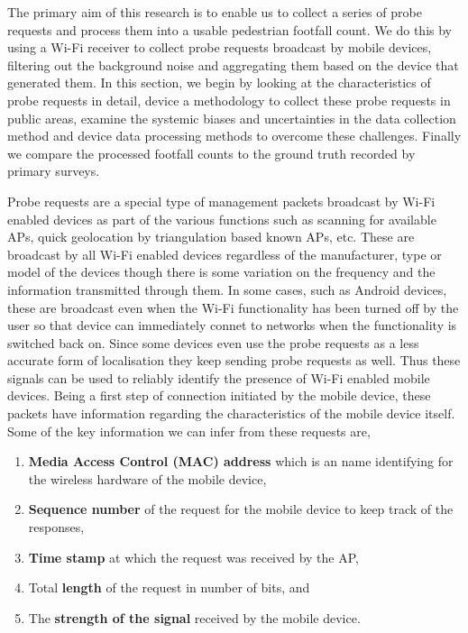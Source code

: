 The primary aim of this research is to enable us to collect a series of probe
requests and process them into a usable pedestrian footfall count. We do this by
using a Wi-Fi receiver to collect probe requests broadcast by mobile devices,
filtering out the background noise and aggregating them based on the device that
generated them. In this section, we begin by looking at the characteristics of
probe requests in detail, device a methodology to collect these probe requests
in public areas, examine the systemic biases and uncertainties in the data
collection method and device data processing methods to overcome these
challenges. Finally we compare the processed footfall counts to the ground truth
recorded by primary surveys.

Probe requests are a special type of management packets broadcast by Wi-Fi
enabled devices as part of the various functions such as scanning for available
APs, quick geolocation by triangulation based known APs, etc. These are
broadcast by all Wi-Fi enabled devices regardless of the manufacturer, type or
model of the devices though there is some variation on the frequency and the
information transmitted through them. In some cases, such as Android devices,
these are broadcast even when the Wi-Fi functionality has been turned off by
the user so that device can immediately connet to networks when the
functionality is switched back on. Since some devices even use the probe
requests as a less accurate form of localisation they keep sending probe
requests as well. Thus these signals can be used to reliably identify the
presence of Wi-Fi enabled mobile devices. Being a first step of connection
initiated by the mobile device, these packets have information regarding the
characteristics of the mobile device itself. Some of the key information we can
infer from these requests are,

\begin{enumerate} 
\item \textbf{Media Access Control (MAC) address} which is an name identifying
	for the wireless hardware of the mobile device, 
\item \textbf{Sequence number} of the request for the mobile device to keep
	track of the responses, 
\item \textbf{Time stamp} at which the request was received by the AP, 
\item Total \textbf{length} of the request in number of bits, and 
\item The \textbf{strength of the signal} received by the mobile device.
\end{enumerate}

